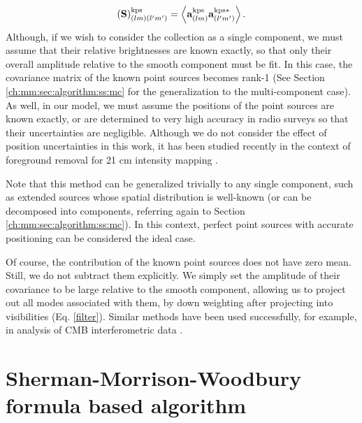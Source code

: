 \begin{equation}
\mathbf{(S)}^{\rm kps}_{(lm)(l'm')} = \left\langle \mathbf{a}^{\rm kps}_{(lm)}\mathbf{a}^{{\rm kps}*}_{(l'm')}\right\rangle.
\label{kpscov}
\end{equation}
Although, if we wish to consider the collection as a single component, we must assume that their relative brightnesses are known exactly, so that only their overall amplitude relative to the smooth component must be fit. In this case, the covariance matrix of the known point sources becomes rank-1 (See Section \ref{ch:mm:sec:algorithm:ss:mc} for the generalization to the multi-component case). As well, in our model, we must assume the positions of the point sources are known exactly, or are determined to very high accuracy in radio surveys so that their uncertainties are negligible. Although we do not consider the effect of position uncertainties in this work, it has been studied recently in the context of foreground removal for 21 cm intensity mapping \citep{barry2016, ewall-wice2016}. 

Note that this method can be generalized trivially to any single component, such as extended sources whose spatial distribution is well-known (or can be decomposed into components, referring again to Section \ref{ch:mm:sec:algorithm:ss:mc}). In this context, perfect point sources with accurate positioning can be considered the ideal case. 

Of course, the contribution of the known point sources does not have zero mean. Still, we do not subtract them explicitly. We simply set the amplitude of their covariance to be large relative to the smooth component, allowing us to project out all modes associated with them, by down weighting after projecting into visibilities (Eq. \eqref{filter}). Similar methods have been used successfully, for example, in analysis of CMB interferometric data \citep{myerscbi}.

\section{Sherman-Morrison-Woodbury formula based algorithm}
\label{ch:mm:sec:algorithm}

